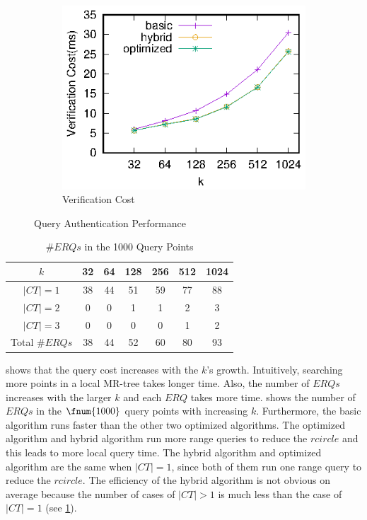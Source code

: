 \begin{figure}[t]
\begin{subfigure}[t]{.33\linewidth}
    \includegraphics[width=\linewidth]{exp-figs/knn/verify.eps}
    \caption{Verification Cost}\label{fig:knn:query:verify}
  \end{subfigure}
  \caption{Query Authentication Performance}\label{fig:knn:query}
\end{figure}

\begin{table}[t]
  \centering
  \begin{tabular}{ccccccc}
    \toprule
    $k$         & 32 & 64 & 128 & 256 & 512 & 1024 \\
    \midrule
    $|CT|=1$    & 38 & 44 & 51  & 59  & 77  & 88   \\
    $|CT|=2$    & 0  & 0  & 1   & 1   & 2   & 3    \\
    $|CT|=3$   & 0  & 0  & 0   & 0   & 1   & 2    \\
    Total $\# ERQs$ & 38 & 44 & 52  & 60  & 80  & 93   \\
    \bottomrule
  \end{tabular}
  \caption{$\# ERQs$ in the 1000 Query Points}\label{tab:knn:num-erq}
\end{table}

 shows that the query cost increases with the $k$'s growth. Intuitively, searching more points in a local MR-tree takes longer time. Also, the number of $ERQs$ increases with the larger $k$ and each $ERQ$ takes more time.  shows the number of $ERQs$ in the $\fnum{1000}$ query points with increasing $k$. Furthermore, the basic algorithm runs faster than the other two optimized algorithms. The optimized algorithm and hybrid algorithm run more range queries to reduce the $rcircle$ and this leads to more local query time. The hybrid algorithm and optimized algorithm are the same when $|CT|=1$, since both of them run one range query to reduce the $rcircle$. The efficiency of the hybrid algorithm is not obvious on average because the number of cases of $|CT|>1$ is much less than the case of $|CT|=1$ (see \cref{tab:knn:num-erq}).


